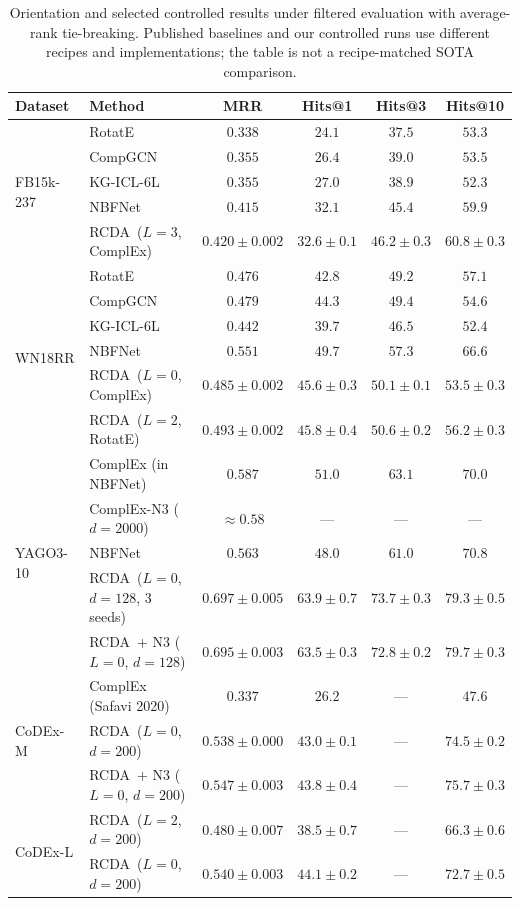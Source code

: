\documentclass[runningheads]{llncs}
\newcommand{\ours}{\textsc{RCDA}\xspace}
\begin{document}
\begin{table}[!htbp]
\centering
\caption{Orientation and selected controlled results under filtered evaluation with average-rank tie-breaking. Published baselines and our controlled runs use different recipes and implementations; the table is not a recipe-matched SOTA comparison.}
\label{tab:main}
\small
\setlength{\tabcolsep}{3pt}
\begin{tabular}{llcccc}
\toprule
Dataset & Method & MRR & Hits@1 & Hits@3 & Hits@10 \\
\midrule
\multirow{5}{*}{FB15k-237}
& RotatE        & $0.338$ & $24.1$ & $37.5$ & $53.3$ \\
& CompGCN       & $0.355$ & $26.4$ & $39.0$ & $53.5$ \\
& KG-ICL-6L     & $0.355$ & $27.0$ & $38.9$ & $52.3$ \\
& NBFNet        & $0.415$ & $32.1$ & $45.4$ & $59.9$ \\
& \ours\ ($L{=}3$, ComplEx) & $0.420{\pm}0.002$ & $32.6{\pm}0.1$ & $46.2{\pm}0.3$ & $60.8{\pm}0.3$ \\
\midrule
\multirow{6}{*}{WN18RR}
& RotatE        & $0.476$ & $42.8$ & $49.2$ & $57.1$ \\
& CompGCN       & $0.479$ & $44.3$ & $49.4$ & $54.6$ \\
& KG-ICL-6L     & $0.442$ & $39.7$ & $46.5$ & $52.4$ \\
& NBFNet        & $0.551$ & $49.7$ & $57.3$ & $66.6$ \\
& \ours\ ($L{=}0$, ComplEx) & $0.485{\pm}0.002$ & $45.6{\pm}0.3$ & $50.1{\pm}0.1$ & $53.5{\pm}0.3$ \\
& \ours\ ($L{=}2$, RotatE) & $0.493{\pm}0.002$ & $45.8{\pm}0.4$ & $50.6{\pm}0.2$ & $56.2{\pm}0.3$ \\
\midrule
\multirow{5}{*}{YAGO3-10}
& ComplEx (in NBFNet)     & $0.587$ & $51.0$ & $63.1$ & $70.0$ \\
& ComplEx-N3 ($d{=}2000$) & $\approx 0.58$ & --- & --- & --- \\
& NBFNet                  & $0.563$ & $48.0$ & $61.0$ & $70.8$ \\
& \ours\ ($L{=}0$, $d{=}128$, 3 seeds) & $0.697{\pm}0.005$ & $63.9{\pm}0.7$ & $73.7{\pm}0.3$ & $79.3{\pm}0.5$ \\
& \ours\ + N3 ($L{=}0$, $d{=}128$) & $0.695{\pm}0.003$ & $63.5{\pm}0.3$ & $72.8{\pm}0.2$ & $79.7{\pm}0.3$ \\
\midrule
\multirow{3}{*}{CoDEx-M}
& ComplEx (Safavi 2020)         & $0.337$ & $26.2$ & --- & $47.6$ \\
& \ours\ ($L{=}0$, $d{=}200$)   & $0.538{\pm}0.000$ & $43.0{\pm}0.1$ & --- & $74.5{\pm}0.2$ \\
& \ours\ + N3 ($L{=}0$, $d{=}200$) & $0.547{\pm}0.003$ & $43.8{\pm}0.4$ & --- & $75.7{\pm}0.3$ \\
\midrule
\multirow{2}{*}{CoDEx-L}
& \ours\ ($L{=}2$, $d{=}200$)   & $0.480{\pm}0.007$ & $38.5{\pm}0.7$ & --- & $66.3{\pm}0.6$ \\
& \ours\ ($L{=}0$, $d{=}200$)   & $0.540{\pm}0.003$ & $44.1{\pm}0.2$ & --- & $72.7{\pm}0.5$ \\
\bottomrule
\end{tabular}
\end{table}
\end{document}
